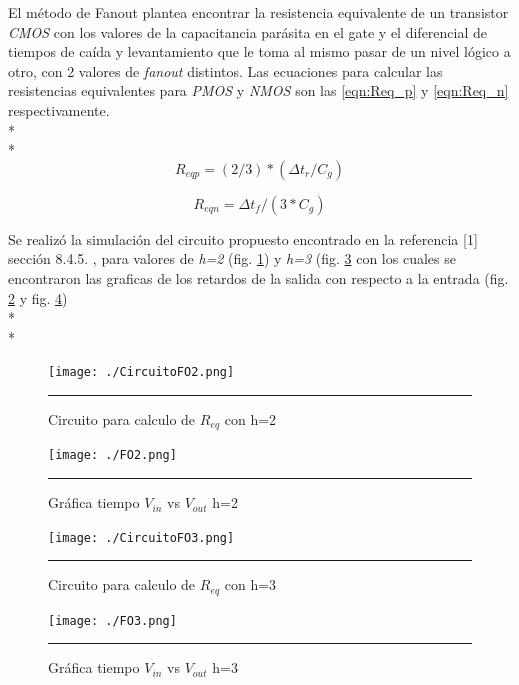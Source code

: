 \documentclass[12pt,a4paper]{article} %
\begin{document}
El método de Fanout plantea encontrar la resistencia equivalente de un transistor \textit{CMOS} con los valores de la capacitancia parásita en el gate y el diferencial de tiempos de caída y levantamiento que le toma al mismo pasar de un nivel lógico a otro, con 2 valores de \textit{fanout} distintos. Las ecuaciones para calcular las resistencias equivalentes para \textit{PMOS} y \textit{NMOS} son las \ref{eqn:Req_p} y \ref{eqn:Req_n} respectivamente.\\*
\\*
\begin{equation}\label{eqn:Req_p}
R_{eqp}=(2/3)*( \Delta t_{r}/C_{g})
\end{equation}

\begin{equation}\label{eqn:Req_n}
R_{eqn}= \Delta t_{f}/(3*C_{g})
\end{equation}

Se realizó la simulación del circuito propuesto encontrado en la referencia [1] sección 8.4.5. , para valores de \textit{h=2} (fig. \ref{fig:CircuitoFO2}) y \textit{h=3} (fig. \ref{fig:CircuitoFO3} con los cuales se encontraron las graficas de los retardos de la salida con respecto a la entrada (fig. \ref{fig:FO2} y fig. \ref{fig:FO3})\\*
\\*
\begin{figure}[htbp]
\begin{center}
    \texttt{[image: ./CircuitoFO2.png]}
    \rule{35em}{0.5pt}
  \caption[Captura]{Circuito para calculo de $R_{eq}$ con h=2}
  \label{fig:CircuitoFO2}
  \end{center}
\end{figure}

\begin{figure}[htbp]
  \centering
    \texttt{[image: ./FO2.png]}
    \rule{35em}{1pt}
  \caption[Captura]{Gráfica tiempo $V_{in}$ vs $V_{out}$ h=2}
  \label{fig:FO2}
\end{figure}

\begin{figure}[htbp]
\begin{center}
    \texttt{[image: ./CircuitoFO3.png]}
    \rule{35em}{0.5pt}
  \caption[Captura]{Circuito para calculo de $R_{eq}$ con h=3}
  \label{fig:CircuitoFO3}
  
\end{center}
\end{figure}

\begin{figure}[htbp]
  \begin{center}
    \texttt{[image: ./FO3.png]}
    \rule{35em}{0.5pt}
  \caption[Captura]{Gráfica tiempo $V_{in}$ vs $V_{out}$ h=3}
  \label{fig:FO3}
  \end{center}
\end{figure}
\end{document}
